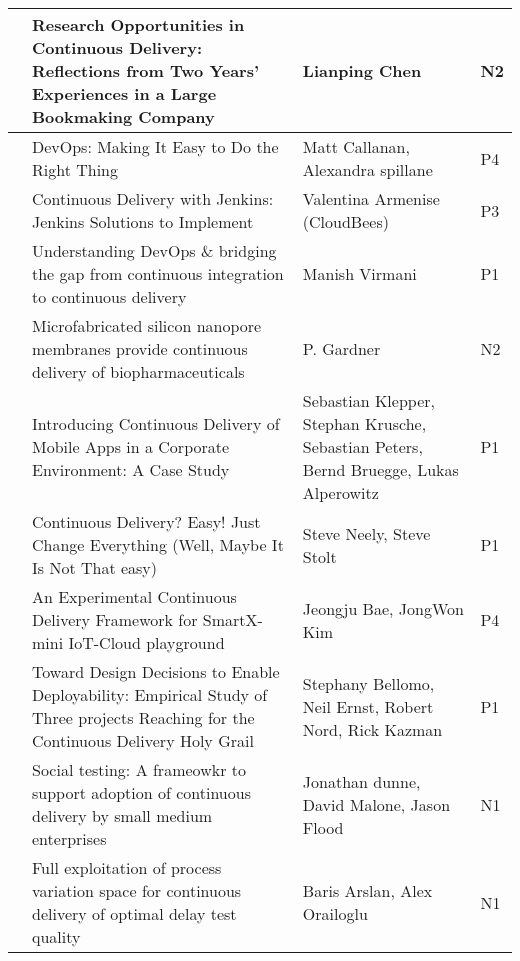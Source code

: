 \begin{landscape}
\begin{longtable}{|l|L{10cm}|L{10cm}|l|}
    & Research Opportunities in Continuous Delivery: Reflections from Two Years' Experiences in a Large Bookmaking Company & Lianping Chen & N2 \\ \hline
   
    & DevOps: Making It Easy to Do the Right Thing & Matt Callanan, Alexandra spillane & P4 \\ \hline
   
    & Continuous Delivery with Jenkins: Jenkins Solutions to Implement & Valentina Armenise (CloudBees) & P3 \\ \hline
   
    & Understanding DevOps \& bridging the gap from continuous integration to continuous delivery & Manish Virmani & P1 \\ \hline
   
    & Microfabricated silicon nanopore membranes provide continuous delivery of biopharmaceuticals & P. Gardner & N2 \\ \hline
   
    & Introducing Continuous Delivery of Mobile Apps in a Corporate Environment: A Case Study & Sebastian Klepper, Stephan Krusche, Sebastian Peters, Bernd Bruegge, Lukas Alperowitz & P1 \\ \hline
   
    & Continuous Delivery? Easy! Just Change Everything (Well, Maybe It Is Not That easy) & Steve Neely, Steve Stolt & P1 \\ \hline
   
    & An Experimental Continuous Delivery Framework for SmartX-mini IoT-Cloud playground & Jeongju Bae, JongWon Kim & P4 \\ \hline
   
    & Toward Design Decisions to Enable Deployability: Empirical Study of Three projects Reaching for the Continuous Delivery Holy Grail & Stephany Bellomo, Neil Ernst, Robert Nord, Rick Kazman & P1 \\ \hline
   
    & Social testing: A frameowkr to support adoption of continuous delivery by small medium enterprises & Jonathan dunne, David Malone, Jason Flood & N1 \\ \hline
   
    & Full exploitation of process variation space for continuous delivery of optimal delay test quality & Baris Arslan, Alex Orailoglu & N1 \\ \hline
   

\end{longtable}
\end{landscape}
